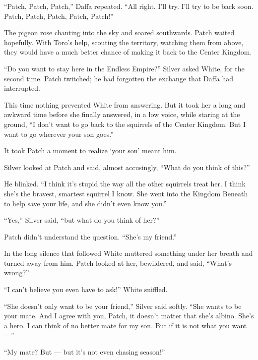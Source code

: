 \documentclass[ebook,oneside,openany,17pt]{memoir}
\newenvironment{tolerant}[1]{%
  \par\tolerance=#1\relax
}{%
  \par
}
\begin{document}
“Patch, Patch, Patch,” Daffa repeated. “All right. I’ll try. I’ll try
to be back soon. Patch, Patch, Patch, Patch, Patch!”

\begin{tolerant}{2000}
The pigeon rose chanting into the sky and soared southwards. Patch
waited hopefully. With Toro’s help, scouting the territory, watching
them from above, they would have a much better chance of making it
back to the Center Kingdom.
\end{tolerant}

“Do you want to stay here in the Endless Empire?” Silver asked White,
for the second time. Patch twitched; he had forgotten the exchange
that Daffa had interrupted.

This time nothing prevented White from answering. But it took her a
long and awkward time before she finally answered, in a low voice,
while staring at the ground, “I don’t want to go back to the squirrels
of the Center Kingdom. But I want to go wherever your son goes.”

\begin{tolerant}{2000}
It took Patch a moment to realize ‘your son’ meant him.
\end{tolerant}

Silver looked at Patch and said, almost accusingly, “What do you think
of this?”

He blinked. “I think it’s stupid the way all the other squirrels treat
her. I think she’s the bravest, smartest squirrel I know. She went
into the Kingdom Beneath to help save your life, and she didn’t even
know you.”

“Yes,” Silver said, “but what do you think of her?”

Patch didn’t understand the question. “She’s my friend.”

\begin{tolerant}{1000}
In the long silence that followed White muttered something under her
breath and turned away from him. Patch looked at her, bewildered, and
said, “What’s wrong?”
\end{tolerant}

“I can’t believe you even have to ask!” White sniffled.

“She doesn’t only want to be your friend,” Silver said softly. “She
wants to be your mate. And I agree with you, Patch, it doesn’t matter
that she’s albino. She’s a hero. I can think of no better mate for my
son. But if it is not what you want —”

“My mate? But — but it’s not even chasing season!”
\end{document}

